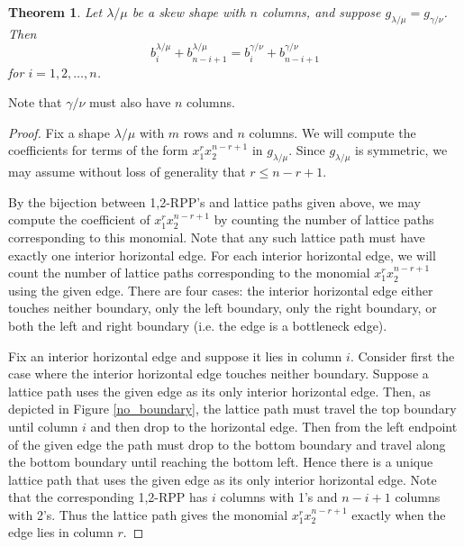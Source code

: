 \documentclass[12pt]{amsart}
\newtheorem{thm}{Theorem}[section]
\theoremstyle{definition}
\begin{document}
\begin{thm} \label{bottleneck_cond} Let $\lambda/\mu$ be a skew shape with $n$ columns, and suppose $g_{\lambda / \mu} = g_{\gamma / \nu}$. Then
\[
 b_i^{\lambda / \mu}+b_{n-i+1}^{\lambda  / \mu} = b_i^{\gamma / \nu}+b_{n-i+1}^{\gamma / \nu}
\]
for $i=1,2,\ldots,n$. 
\end{thm}
Note that $\gamma/\nu$ must also have $n$ columns.
\begin{proof}
Fix a shape $\lambda / \mu$ with $m$ rows and $n$ columns. We will compute the coefficients for terms of the form $x_1^r x_2^{n-r+1}$ in $g_{\lambda/\mu}$. Since $g_{\lambda/\mu}$ is symmetric, we may assume without loss of generality that $r \leq n-r+1$. 

By the bijection between 1,2-RPP's and lattice paths given above, we may compute the coefficient of $x_1^r x_2^{n-r+1}$ by counting the number of lattice paths corresponding to this monomial. Note that any such lattice path must have exactly one interior horizontal edge. For each interior horizontal edge, we will count the number of lattice paths corresponding to the monomial $x_1^r x_2^{n-r+1}$ using the given edge. There are four cases: the interior horizontal edge either touches neither boundary, only the left boundary, only the right boundary, or both the left and right boundary (i.e. the edge is a bottleneck edge).

Fix an interior horizontal edge and suppose it lies in column $i$. Consider first the case where the interior horizontal edge touches neither boundary. Suppose a lattice path uses the given edge as its only interior horizontal edge. Then, as depicted in Figure \ref{no_boundary}, the lattice path must travel the top boundary until column $i$ and then drop to the horizontal edge. Then from the left endpoint of the given edge the path must drop to the bottom boundary and travel along the bottom boundary until reaching the bottom left. Hence there is a unique lattice path that uses the given edge as its only interior horizontal edge. Note that the corresponding 1,2-RPP has $i$ columns with 1's and $n-i+1$ columns with 2's. Thus the lattice path gives the monomial $x_1^r x_2^{n-r+1}$ exactly when the edge lies in column $r$.


\end{proof}
\end{document}
